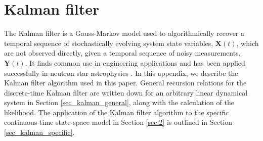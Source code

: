\documentclass[fleqn,usenatbib,useAMS]{mnras}
\begin{document}
\section{Kalman filter} \label{sec:kalman}
The Kalman filter \citep{Kalman1} is a Gauss-Markov model used to algorithmically recover a temporal sequence of stochastically evolving  system state variables, $\boldsymbol{X}(t)$, which are not observed directly, given a temporal sequence of noisy measurements, $\boldsymbol{Y}(t)$. It finds common use in engineering applications and has been applied successfully in neutron star astrophysics \citep[e.g.][]{Myers2021MNRAS.502.3113M,Meyers2021,Melatos2023}. In this appendix, we describe the Kalman filter algorithm used in this paper. General recursion relations for the discrete-time Kalman filter are written down for an arbitrary linear dynamical system in Section \ref{sec_kalman_general}, along with the calculation of the likelihood. The application of the Kalman filter algorithm to the specific continuous-time state-space model in Section \ref{sec:2} is outlined in Section \ref{sec_kalman_specific}.


%
\end{document}

